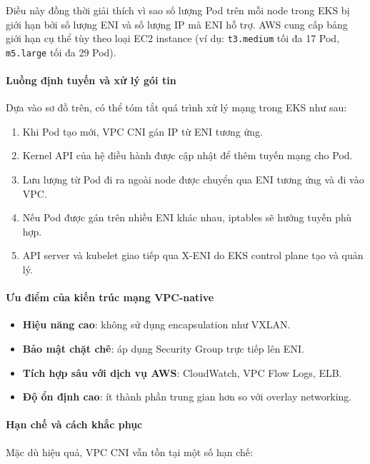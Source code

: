 Điều này đồng thời giải thích vì sao số lượng Pod trên mỗi node trong EKS bị giới hạn 
bởi số lượng ENI và số lượng IP mà ENI hỗ trợ. AWS cung cấp bảng giới hạn cụ thể tùy 
theo loại EC2 instance (ví dụ: \texttt{t3.medium} tối đa 17 Pod, \texttt{m5.large} tối đa 29 Pod).

\paragraph*{Luồng định tuyến và xử lý gói tin}

Dựa vào sơ đồ trên, có thể tóm tắt quá trình xử lý mạng trong EKS như sau:

\begin{enumerate}
    \item Khi Pod tạo mới, VPC CNI gán IP từ ENI tương ứng.
    \item Kernel API của hệ điều hành được cập nhật để thêm tuyến mạng cho Pod.
    \item Lưu lượng từ Pod đi ra ngoài node được chuyển qua ENI tương ứng và đi vào VPC.
    \item Nếu Pod được gán trên nhiều ENI khác nhau, iptables sẽ hướng tuyến phù hợp.
    \item API server và kubelet giao tiếp qua X-ENI do EKS control plane tạo và quản lý.
\end{enumerate}

\paragraph*{Ưu điểm của kiến trúc mạng VPC-native}

\begin{itemize}
    \item \textbf{Hiệu năng cao}: không sử dụng encapsulation như VXLAN.
    \item \textbf{Bảo mật chặt chẽ}: áp dụng Security Group trực tiếp lên ENI.
    \item \textbf{Tích hợp sâu với dịch vụ AWS}: CloudWatch, VPC Flow Logs, ELB.
    \item \textbf{Độ ổn định cao}: ít thành phần trung gian hơn so với overlay networking.
\end{itemize}

\paragraph*{Hạn chế và cách khắc phục}

Mặc dù hiệu quả, VPC CNI vẫn tồn tại một số hạn chế:

